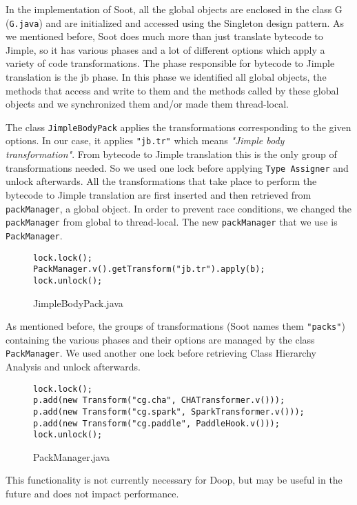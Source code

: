 \documentclass{dithesis}
\begin{document}
    In the implementation of Soot, all the global objects are enclosed in the class G (\texttt{G.java}) and are initialized and accessed using the Singleton design pattern. As we mentioned before, Soot does much more than just translate bytecode to Jimple, so it has various phases and a lot of different options which apply a variety of code transformations. The phase responsible for bytecode to Jimple translation is the jb phase. In this phase we identified all global objects, the methods that access and write to them and the methods called by these global objects and we synchronized them and/or made them thread-local.

	    	The class \texttt{JimpleBodyPack} applies the transformations corresponding to the given options. In our case, it applies \texttt{"jb.tr"} which means \textit{"Jimple body transformation"}. From bytecode to Jimple translation this is the only group of transformations needed. So we used one lock before applying \texttt{Type Assigner} and unlock afterwards. All the transformations that take place to perform the bytecode to Jimple translation are first inserted and then retrieved from \texttt{packManager}, a global object. In order to prevent race conditions, we changed the \texttt{packManager} from global to thread-local. The new \texttt{packManager} that we use is \texttt{PackManager}.
	    	\begin{figure}[H]
\begin{lstlisting}
lock.lock();
PackManager.v().getTransform("jb.tr").apply(b);
lock.unlock();
\end{lstlisting}
	        \caption{JimpleBodyPack.java}
	        \end{figure}

	    	As mentioned before, the groups of transformations (Soot names them \texttt{"packs"}) containing the various phases and their options are managed by the class \texttt{PackManager}. We used another one lock before retrieving Class Hierarchy Analysis and unlock afterwards.
			\begin{figure}[H]
\begin{lstlisting}
lock.lock();
p.add(new Transform("cg.cha", CHATransformer.v()));
p.add(new Transform("cg.spark", SparkTransformer.v()));
p.add(new Transform("cg.paddle", PaddleHook.v()));
lock.unlock();
\end{lstlisting}
	        \caption{PackManager.java}
	        \end{figure}
            This functionality is not currently necessary for Doop, but may be useful in the future and does not impact performance. 
\end{document}
